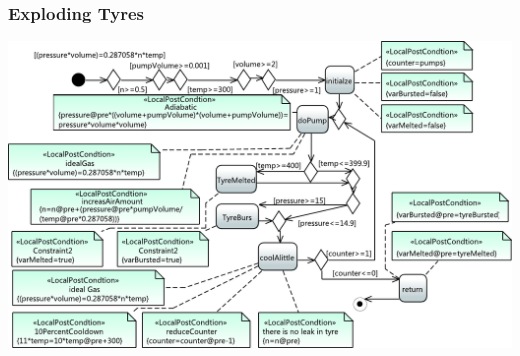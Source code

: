 \documentclass{beamer}
\begin{document}
\begin{frame}
\frametitle{Exploding Tyres}
% 
\includegraphics[width=\textwidth]{./pics/TyrePump.pdf}
\end{frame}
\end{document}
